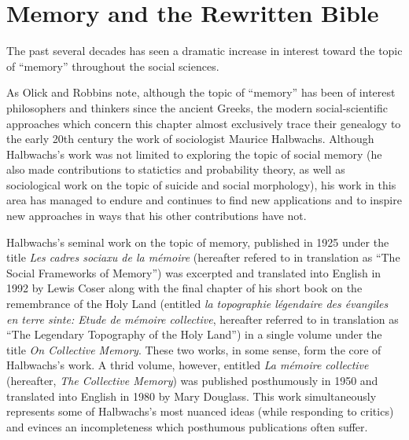 \hypertarget{memory-and-the-rwb}{%
\chapter{Memory and the Rewritten Bible}\label{memory-and-the-rwb}}

The past several decades has seen a dramatic increase in interest toward
the topic of ``memory'' throughout the social sciences.

As Olick and Robbins note, although the topic of ``memory'' has been of
interest philosophers and thinkers since the ancient Greeks, the modern
social-scientific approaches which concern this chapter almost
exclusively trace their genealogy to the early 20th century the work of
sociologist Maurice Halbwachs.\autocite[106]{olick-robbins_ars1998}
Although Halbwachs's work was not limited to exploring the topic of
social memory (he also made contributions to statictics and probability
theory, as well as sociological work on the topic of suicide and social
morphology\autocite[13--20]{coser_halbwachs1992}), his work in this area
has managed to endure and continues to find new applications and to
inspire new approaches in ways that his other contributions have not.

Halbwachs's seminal work on the topic of memory, published in 1925 under
the title \emph{Les cadres sociaxu de la mémoire} (hereafter refered to
in translation as ``The Social Frameworks of Memory'') was excerpted and
translated into English in 1992 by Lewis Coser along with the final
chapter of his short book on the remembrance of the Holy Land (entitled
\emph{la topographie légendaire des évangiles en terre sinte: Etude de
mémoire collective}, hereafter referred to in translation as ``The
Legendary Topography of the Holy Land'') in a single volume under the
title \emph{On Collective Memory}.\autocite{halbwachs1992} These two
works, in some sense, form the core of Halbwachs's work. A thrid volume,
however, entitled \emph{La mémoire collective} (hereafter, \emph{The
Collective Memory}) was published posthumously in 1950 and translated
into English in 1980 by Mary Douglass. This work simultaneously
represents some of Halbwachs's most nuanced ideas (while responding to
critics) and evinces an incompleteness which posthumous publications
often suffer.\autocite[\^{} Coser observes, ``One may doubt that the
author himself would have been willing to publish it in what seems to be
an unfinished state. The book nevertheless contains many further
developments of Halbwachs's thought in regard to such matters as the
relation of space and time to collective memory as well as fruitful
definitions and applications of the differences between individual,
collective, and historical memory.''][2]{coser_halbwachs1992}

